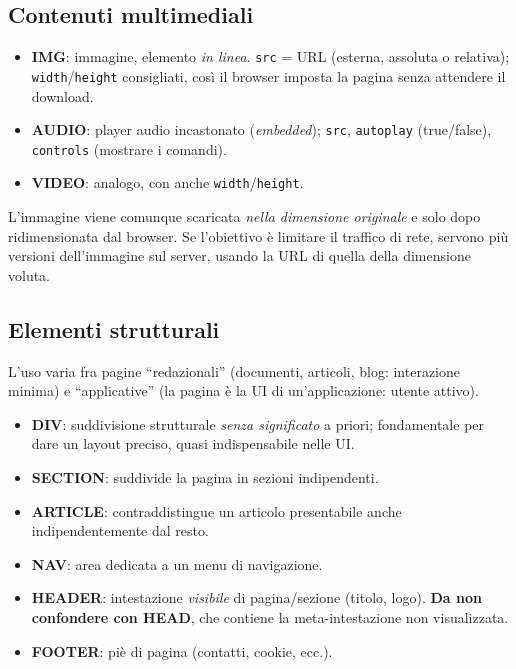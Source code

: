 \subsection{Contenuti multimediali}
\begin{itemize}
  \item \textbf{IMG}: immagine, elemento \emph{in linea}. \texttt{src} = URL (esterna,
        assoluta o relativa); \texttt{width}/\texttt{height} consigliati, cos\`i il browser
        imposta la pagina senza attendere il download.
  \item \textbf{AUDIO}: player audio incastonato (\emph{embedded}); \texttt{src},
        \texttt{autoplay} (true/false), \texttt{controls} (mostrare i comandi).
  \item \textbf{VIDEO}: analogo, con anche \texttt{width}/\texttt{height}.
\end{itemize}
\begin{attenzione}
L'immagine viene comunque scaricata \emph{nella dimensione originale} e solo dopo
ridimensionata dal browser. Se l'obiettivo \`e limitare il traffico di rete, servono pi\`u
versioni dell'immagine sul server, usando la URL di quella della dimensione voluta.
\end{attenzione}

\subsection{Elementi strutturali}
L'uso varia fra pagine ``redazionali'' (documenti, articoli, blog: interazione minima) e
``applicative'' (la pagina \`e la UI di un'applicazione: utente attivo).
\begin{itemize}
  \item \textbf{DIV}: suddivisione strutturale \emph{senza significato} a priori;
        fondamentale per dare un layout preciso, quasi indispensabile nelle UI.
  \item \textbf{SECTION}: suddivide la pagina in sezioni indipendenti.
  \item \textbf{ARTICLE}: contraddistingue un articolo presentabile anche indipendentemente
        dal resto.
  \item \textbf{NAV}: area dedicata a un menu di navigazione.
  \item \textbf{HEADER}: intestazione \emph{visibile} di pagina/sezione (titolo, logo).
        \textbf{Da non confondere con HEAD}, che contiene la meta-intestazione non
        visualizzata.
  \item \textbf{FOOTER}: pi\`e di pagina (contatti, cookie, ecc.).
\end{itemize}

